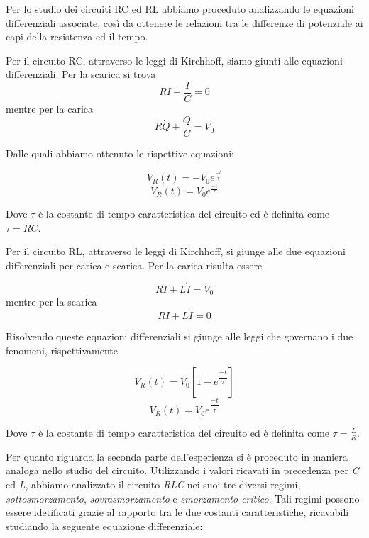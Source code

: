 Per lo studio dei circuiti RC ed RL abbiamo proceduto analizzando le equazioni differenziali associate, così da ottenere le relazioni tra le differenze di potenziale ai capi della resistenza ed il tempo.

Per il circuito RC, attraverso le leggi di Kirchhoff, siamo giunti alle equazioni differenziali. Per la scarica si trova
\begin{equation}
R\dot{I}+\frac{I}{C}=0
\end{equation}
mentre per la carica
\begin{equation}
    R\dot{Q}+\frac{Q}{C}=V_{0}
\end{equation}

Dalle quali abbiamo ottenuto le rispettive equazioni:

\begin{equation}
V_{R}(t)=-V_{0}e^{\frac{-t}{\tau}}
\end{equation}
\begin{equation}
    V_{R}(t)=V_{0}e^{\frac{-t}{\tau}}
\end{equation}

Dove $\tau$ è la costante di tempo caratteristica del circuito ed è definita come $\tau=RC$.

Per il circuito RL, attraverso le leggi di Kirchhoff, si giunge alle due equazioni differenziali per carica e scarica. Per la carica risulta essere

\begin{equation}
RI+L\dot{I}=V_{0}
\end{equation}
mentre per la scarica
\begin{equation}
    RI+L\dot{I}=0
\end{equation}

Risolvendo queste equazioni differenziali si giunge alle leggi che governano i due fenomeni, rispettivamente

\begin{equation}
V_{R}(t)=V_{0}\left[1-e^{\dfrac{-t}{\tau}}\right]
\label{eq. 7}
\end{equation}
\begin{equation}
    V_{R}(t)=V_{0}e^{\dfrac{-t}{\tau}}
    \label{eq.8}
\end{equation}

Dove $\tau$ è la costante di tempo caratteristica del circuito ed è definita come $\tau=\frac{L}{R}$.

Per quanto riguarda la seconda parte dell'esperienza si è proceduto in maniera analoga nello studio del circuito. Utilizzando i valori ricavati in precedenza per \textit{C} ed \textit{L}, abbiamo analizzato il circuito \textit{RLC} nei suoi tre diversi regimi, \textit{sottosmorzamento}, \textit{sovrasmorzamento} e \textit{smorzamento critico}.
Tali regimi possono essere idetificati grazie al rapporto tra le due costanti caratteristiche, ricavabili studiando la seguente equazione differenziale:

